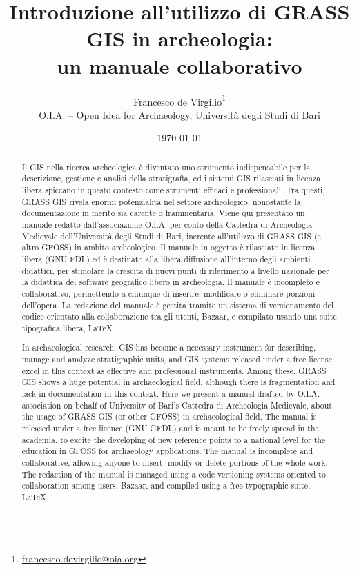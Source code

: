 \documentclass{article}
\title{Introduzione all'utilizzo di GRASS GIS in archeologia:\\un manuale collaborativo}
\author{Francesco de Virgilio\footnote{\href{mailto:francesco.devirgilio@oia.org}{francesco.devirgilio@oia.org}}\\ \small{O.I.A. -- Open Idea for Archaeology, Università degli Studi di Bari}}
\date{\today}
\newenvironment{poliabstract}[1]
{\renewcommand{\abstractname}{#1}\begin{abstract}}
{\end{abstract}}
\begin{document}
	\maketitle

	\begin{poliabstract}{Sommario}
		Il GIS nella ricerca archeologica è diventato uno strumento indispensabile per la descrizione, gestione e analisi della stratigrafia, ed i sistemi GIS rilasciati in licenza libera spiccano in questo contesto come strumenti efficaci e professionali. Tra questi, GRASS GIS rivela enormi potenzialità nel settore archeologico, nonostante la documentazione in merito sia carente o frammentaria. Viene qui presentato un manuale redatto dall'associazione O.I.A. per conto della Cattedra di Archeologia Medievale dell'Università degli Studi di Bari, inerente all'utilizzo di GRASS GIS (e altro GFOSS) in ambito archeologico. Il manuale in oggetto è rilasciato in licenza libera (GNU FDL) ed è destinato alla libera diffusione all'interno degli ambienti didattici, per stimolare la crescita di nuovi punti di riferimento a livello nazionale per la didattica del software geografico libero in archeologia. Il manuale è incompleto e collaborativo, permettendo a chiunque di inserire, modificare o eliminare porzioni dell'opera. La redazione del manuale è gestita tramite un sistema di versionamento del codice orientato alla collaborazione tra gli utenti, Bazaar, e compilato usando una suite tipografica libera, \LaTeX.
	\end{poliabstract}

	\begin{poliabstract}{Abstract}
		In archaeological research, GIS has become a necessary instrument for describing, manage and analyze stratigraphic units, and GIS systems released under a free license excel in this context as effective and professional instruments. Among these, GRASS GIS shows a huge potential in archaeological field, although there is fragmentation and lack in documentation in this context. Here we present a manual drafted by O.I.A. association on behalf of University of Bari's Cattedra di Archeologia Medievale, about the usage of GRASS GIS (or other GFOSS) in archaeological field. The manual is released under a free licence (GNU GFDL) and is meant to be freely spread in the academia, to excite the developing of new reference points to a national level for the education in GFOSS for archaeology applications. The manual is incomplete and collaborative, allowing anyone to insert, modify or delete portions of the whole work. The redaction of the manual is managed using a code versioning systems oriented to collaboration among users, Bazaar, and compiled using a free typographic suite, \LaTeX.
	\end{poliabstract}
\end{document}
